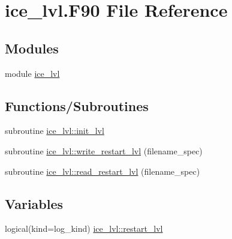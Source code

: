 \hypertarget{ice__lvl_8F90}{
\section{ice\_\-lvl.F90 File Reference}
\label{ice__lvl_8F90}
}
\subsection*{Modules}
\begin{DoxyCompactItemize}
\item 
module \hyperlink{namespaceice__lvl}{ice\_\-lvl}
\end{DoxyCompactItemize}
\subsection*{Functions/Subroutines}
\begin{DoxyCompactItemize}
\item 
subroutine \hyperlink{namespaceice__lvl_a4298ecb49107c3f040307793376f2215}{ice\_\-lvl::init\_\-lvl}
\item 
subroutine \hyperlink{namespaceice__lvl_adee9ebc38f9bb2b4317bd8d3660f2976}{ice\_\-lvl::write\_\-restart\_\-lvl} (filename\_\-spec)
\item 
subroutine \hyperlink{namespaceice__lvl_a232fc1c39cbe24fe6ab3f1e65457b4fa}{ice\_\-lvl::read\_\-restart\_\-lvl} (filename\_\-spec)
\end{DoxyCompactItemize}
\subsection*{Variables}
\begin{DoxyCompactItemize}
\item 
logical(kind=log\_\-kind) \hyperlink{namespaceice__lvl_a889f31c602d28473918e09b006ae7e0f}{ice\_\-lvl::restart\_\-lvl}
\end{DoxyCompactItemize}
